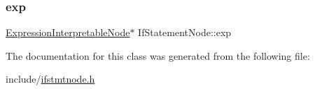 \subsubsection{\texorpdfstring{exp}{exp}}
{\footnotesize\ttfamily \hyperlink{classExpressionInterpretableNode}{Expression\+Interpretable\+Node}$\ast$ If\+Statement\+Node\+::exp}



The documentation for this class was generated from the following file\+:\begin{DoxyCompactItemize}
\item 
include/\hyperlink{ifstmtnode_8h}{ifstmtnode.\+h}\end{DoxyCompactItemize}
